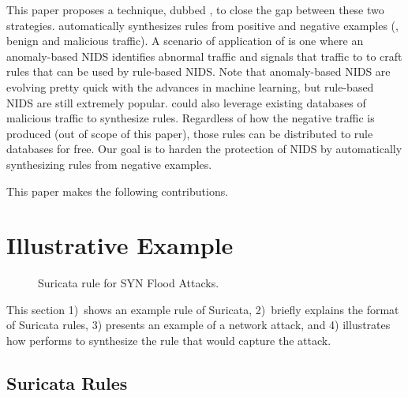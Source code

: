 \documentclass[conference]{IEEEtran}
\begin{document}

This paper proposes a technique, dubbed \tname{}, to close the gap
between these two strategies. \tname{} automatically synthesizes rules
from positive and negative examples (\ie{}, benign and malicious
traffic). A scenario of application of \tname{} is one where an
anomaly-based NIDS identifies abnormal traffic and signals that
traffic to \tname{} to craft rules that can be used by rule-based
NIDS. Note that anomaly-based NIDS are evolving pretty quick with the
advances in machine learning, but rule-based NIDS are still extremely
popular.  \tname{} could also leverage existing databases of malicious
traffic to synthesize rules.  Regardless of how the negative traffic
is produced (out of scope of this paper), those rules can be
distributed to rule databases for free. Our goal is to harden the
protection of NIDS by automatically synthesizing rules from negative
examples.




This paper makes the following contributions.

\section{Illustrative Example}
\label{sec:suri-metas-coverage}

\begin{figure}[t]
  
  \caption{Suricata rule for SYN Flood Attacks.}
  \label{fig:synflood-example}
\end{figure}

This section 1)~shows an example rule of Suricata, 2)~briefly explains
the format of Suricata rules, 3) presents an example of a network
attack, and 4) illustrates how \tname{} performs to synthesize the
rule that would capture the attack.

\subsection{Suricata Rules}
\label{sec:example-suricata-rules}
\end{document}

